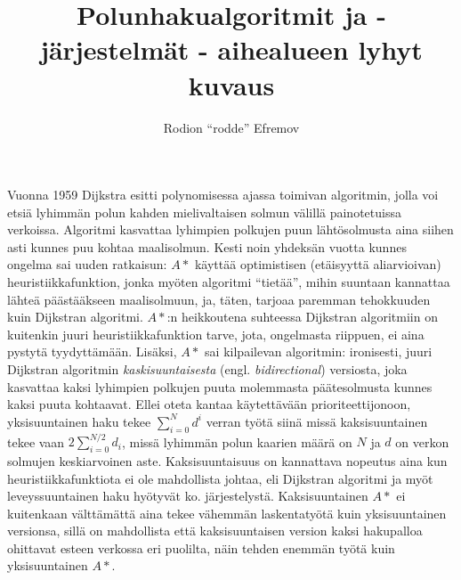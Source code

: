 \documentclass[10pt]{article}
\title{Polunhakualgoritmit ja -järjestelmät - aihealueen lyhyt kuvaus}
\author{Rodion ``rodde'' Efremov}
\begin{document}
 \maketitle
 
Vuonna 1959 Dijkstra esitti polynomisessa ajassa toimivan algoritmin, jolla voi etsiä lyhimmän polun kahden mielivaltaisen solmun välillä painotetuissa verkoissa. Algoritmi kasvattaa lyhimpien polkujen puun lähtösolmusta aina siihen asti kunnes puu kohtaa maalisolmun. Kesti noin yhdeksän vuotta kunnes ongelma sai uuden ratkaisun: $A\ast$ käyttää optimistisen (etäisyyttä aliarvioivan) heuristiikkafunktion, jonka myöten algoritmi ``tietää'', mihin suuntaan kannattaa lähteä päästääkseen maalisolmuun, ja, täten, tarjoaa paremman tehokkuuden kuin Dijkstran algoritmi. $A\ast$:n heikkoutena suhteessa Dijkstran algoritmiin on kuitenkin juuri heuristiikkafunktion tarve, jota, ongelmasta riippuen, ei aina pystytä tyydyttämään. Lisäksi, $A\ast$ sai kilpailevan algoritmin: ironisesti, juuri Dijkstran algoritmin \textit{kaskisuuntaisesta} (engl. \textit{bidirectional}) versiosta, joka kasvattaa kaksi lyhimpien polkujen puuta molemmasta päätesolmusta kunnes kaksi puuta kohtaavat. Ellei oteta kantaa käytettävään prioriteettijonoon, yksisuuntainen haku tekee $\sum_{i = 0}^N d^i$ verran työtä siinä missä kaksisuuntainen tekee vaan $2\sum_{i = 0}^{N/2} d_i$, missä lyhimmän polun kaarien määrä on $N$ ja $d$ on verkon solmujen keskiarvoinen aste. Kaksisuuntaisuus on kannattava nopeutus aina kun heuristiikkafunktiota ei ole mahdollista johtaa, eli Dijkstran algoritmi ja myöt leveyssuuntainen haku hyötyvät ko. järjestelystä. Kaksisuuntainen $A\ast$ ei kuitenkaan välttämättä aina tekee vähemmän laskentatyötä kuin yksisuuntainen versionsa, sillä on mahdollista että kaksisuuntaisen version kaksi hakupalloa ohittavat esteen verkossa eri puolilta, näin tehden enemmän työtä kuin yksisuuntainen $A\ast$.
\end{document}
